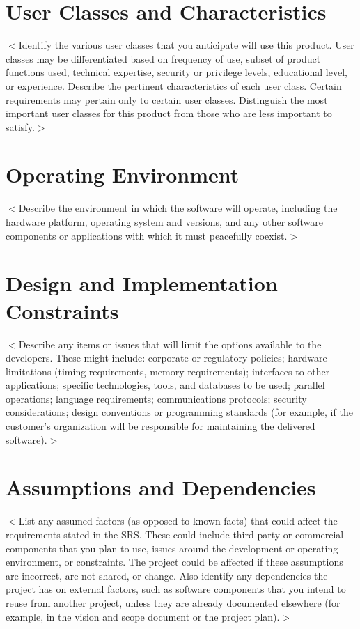 \documentclass[a4paper, 11pt]{scrreprt}
\begin{document}
\section{User Classes and Characteristics}
$<$Identify the various user classes that you anticipate will use this product.  
User classes may be differentiated based on frequency of use, subset of product 
functions used, technical expertise, security or privilege levels, educational 
level, or experience. Describe the pertinent characteristics of each user class.  
Certain requirements may pertain only to certain user classes. Distinguish the 
most important user classes for this product from those who are less important 
to satisfy.$>$

\section{Operating Environment}
$<$Describe the environment in which the software will operate, including the 
hardware platform, operating system and versions, and any other software 
components or applications with which it must peacefully coexist.$>$

\section{Design and Implementation Constraints}
$<$Describe any items or issues that will limit the options available to the 
developers. These might include: corporate or regulatory policies; hardware 
limitations (timing requirements, memory requirements); interfaces to other 
applications; specific technologies, tools, and databases to be used; parallel 
operations; language requirements; communications protocols; security 
considerations; design conventions or programming standards (for example, if the 
customer's organization will be responsible for maintaining the delivered 
software).$>$

\section{Assumptions and Dependencies}
$<$List any assumed factors (as opposed to known facts) that could affect the 
requirements stated in the SRS. These could include third-party or commercial 
components that you plan to use, issues around the development or operating 
environment, or constraints. The project could be affected if these assumptions 
are incorrect, are not shared, or change. Also identify any dependencies the 
project has on external factors, such as software components that you intend to 
reuse from another project, unless they are already documented elsewhere (for 
example, in the vision and scope document or the project plan).$>$
\end{document}
